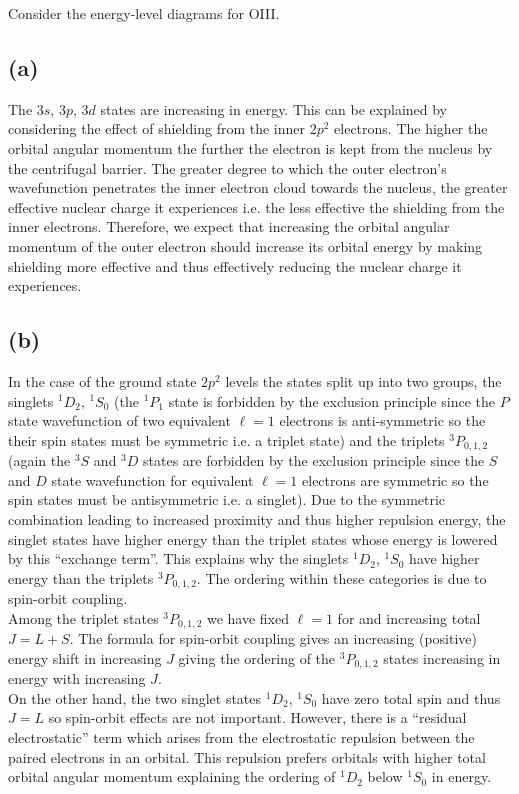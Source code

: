 \documentclass[12pt]{article}
\begin{document}
Consider the energy-level diagrams for OIII.

\subsection*{(a)}

The $3s$, $3p$, $3d$ states are increasing in energy. This can be explained by considering the effect of shielding from the inner $2 p^2$ electrons. The higher the orbital angular momentum the further the electron is kept from the nucleus by the centrifugal barrier. The greater degree to which the outer electron's wavefunction penetrates the inner electron cloud towards the nucleus, the greater effective nuclear charge it experiences i.e. the less effective the shielding from the inner electrons. Therefore, we expect that increasing the orbital angular momentum of the outer electron should increase its orbital energy by making shielding more effective and thus effectively reducing the nuclear charge it experiences. 

\subsection*{(b)}

In the case of the ground state $2p^2$ levels the states split up into two groups, the singlets $^1 D_2$, $^1 S_0$ (the $^1 P_1$ state is forbidden by the exclusion principle since the $P$ state wavefunction of two equivalent $\ell = 1$ electrons is anti-symmetric so the their spin states must be symmetric i.e. a triplet state) and the triplets $^3 P_{0,1,2}$ (again the $^3 S$ and $^3 D$ states are forbidden by the exclusion principle since the $S$ and $D$ state wavefunction for equivalent $\ell = 1$ electrons are symmetric so the spin states must be antisymmetric i.e. a singlet). Due to the symmetric combination leading to increased proximity and thus higher repulsion energy, the singlet states have higher energy than the triplet states whose energy is lowered by this ``exchange term''. This explains why the singlets $^1 D_2$, $^1 S_0$ have higher energy than the triplets $^3 P_{0,1,2}$. The ordering within these categories is due to spin-orbit coupling.
\bigskip\\
Among the triplet  states $^3 P_{0,1,2}$ we have fixed $\ell = 1$ for and increasing total $J = L + S$. The formula for spin-orbit coupling gives an increasing (positive) energy shift in increasing $J$ giving the ordering of the $^3 P_{0,1,2}$ states increasing in energy with increasing $J$.
\bigskip\\
On the other hand, the two singlet states $^1 D_2$, $^1 S_0$ have zero total spin and thus $J = L$ so spin-orbit effects are not important. However, there is a ``residual electrostatic'' term which arises from the electrostatic repulsion between the paired electrons in an orbital. This repulsion prefers orbitals with higher total orbital angular momentum explaining the ordering of $^1 D_2$ below $^1 S_0$ in energy.
\end{document}
